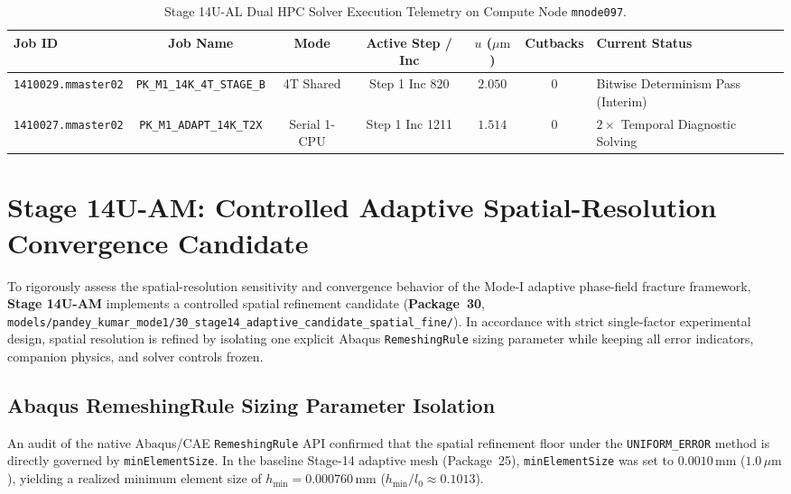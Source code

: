 \begin{table}[htbp]
\centering
\small
\caption{Stage 14U-AL Dual HPC Solver Execution Telemetry on Compute Node \texttt{mnode097}.}
\label{tab:stage14ual_solver_telemetry}
\begin{tabularx}{\textwidth}{l c c c c c X}
\toprule
\textbf{Job ID} & \textbf{Job Name} & \textbf{Mode} & \textbf{Active Step / Inc} & $u$ ($\mu\mathrm{m}$) & \textbf{Cutbacks} & \textbf{Current Status} \\
\midrule
\texttt{1410029.mmaster02} & \texttt{PK\_M1\_14K\_4T\_STAGE\_B} & 4T Shared & Step 1 Inc 820 & $2.050$ & 0 & Bitwise Determinism Pass (Interim) \\
\texttt{1410027.mmaster02} & \texttt{PK\_M1\_ADAPT\_14K\_T2X} & Serial 1-CPU & Step 1 Inc 1211 & $1.514$ & 0 & $2\times$ Temporal Diagnostic Solving \\
\bottomrule
\end{tabularx}
\end{table}

\section{Stage 14U-AM: Controlled Adaptive Spatial-Resolution Convergence Candidate}
\label{sec:stage14uam_spatial_candidate}

To rigorously assess the spatial-resolution sensitivity and convergence behavior of the Mode-I adaptive phase-field fracture framework, \textbf{Stage 14U-AM} implements a controlled spatial refinement candidate (\textbf{Package~30}, \texttt{models/pandey\_kumar\_mode1/30\_stage14\_adaptive\_candidate\_spatial\_fine/}). In accordance with strict single-factor experimental design, spatial resolution is refined by isolating one explicit Abaqus \texttt{RemeshingRule} sizing parameter while keeping all error indicators, companion physics, and solver controls frozen.

\subsection{Abaqus RemeshingRule Sizing Parameter Isolation}
\label{subsec:stage14uam_sizing_isolation}

An audit of the native Abaqus/CAE \texttt{RemeshingRule} API confirmed that the spatial refinement floor under the \texttt{UNIFORM\_ERROR} method is directly governed by \texttt{minElementSize}. In the baseline Stage-14 adaptive mesh (Package~25), \texttt{minElementSize} was set to $0.0010\,\mathrm{mm}$ ($1.0\,\mu\mathrm{m}$), yielding a realized minimum element size of $h_{\min} = 0.000760\,\mathrm{mm}$ ($h_{\min}/l_0 \approx 0.1013$).

